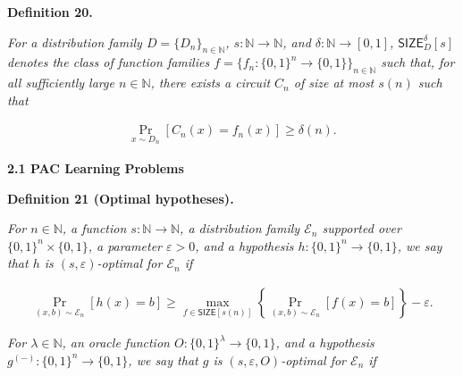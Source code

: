 \documentclass[10pt,a4paper]{article}
\begin{document}




\par\medskip\noindent\textbf{
\textbf{Definition 20}\textbf{.}
}\par



\emph{For a distribution family $D=\{D_{n}\}_{n\in\mathbb{N}}$, $s:\mathbb{N}\to\mathbb{N}$, and $\delta:\mathbb{N}\to[0,1]$, ${\mathsf{SIZE}}_{D}^{\delta}[s]$ denotes the class of function families $f=\{f_{n}:\{0,1\}^{n}\to\{0,1\}\}_{n\in\mathbb{N}}$ such that, for all sufficiently large $n\in\mathbb{N}$, there exists a circuit $C_{n}$ of size at most $s(n)$ such that}\par


\[\begin{gathered}
\Pr_{x\sim D_{n}}[C_{n}(x)=f_{n}(x)]\geq\delta(n).
\end{gathered}\]






\par\medskip\noindent\textbf{
2.1 PAC Learning Problems}\par





\par\medskip\noindent\textbf{
\textbf{Definition 21}\textbf{ }(Optimal hypotheses)\textbf{.}
}\par



\emph{For $n\in\mathbb{N}$, a function $s:\mathbb{N}\to\mathbb{N}$, a distribution family $\mathcal{E}_{n}$ supported over $\{0,1\}^{n}\times\{0,1\}$, a parameter $\varepsilon>0$, and a hypothesis $h:\{0,1\}^{n}\to\{0,1\}$, we say that $h$ is $(s,\varepsilon)$-optimal for $\mathcal{E}_{n}$ if}\par


\[\begin{gathered}
\Pr_{(x,b)\sim\mathcal{E}_{n}}[h(x)=b]\geq\max_{f\in{\mathsf{SIZE}}[s(n)]}\left\{\Pr_{(x,b)\sim\mathcal{E}_{n}}[f(x)=b]\right\}-\varepsilon.
\end{gathered}\]




\emph{For $\lambda\in\mathbb{N}$, an oracle function $O:\{0,1\}^{\lambda}\to\{0,1\}$, and a hypothesis $g^{(-)}:\{0,1\}^{n}\to\{0,1\}$, we say that $g$ is $(s,\varepsilon,O)$-optimal for $\mathcal{E}_{n}$ if}\par
\end{document}
